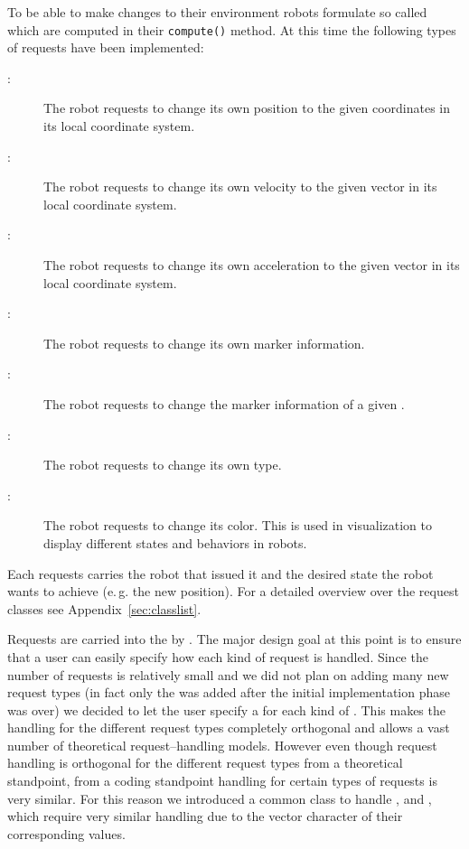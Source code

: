 To be able to make changes to their environment robots formulate so called  which are computed in their \texttt{compute()} method. At this time the following types of requests have been implemented:

\begin{description}
\item[:] The robot requests to change its own position to the given coordinates in its local coordinate system.
\item[:] The robot requests to change its own velocity to the given vector in its local coordinate system.
\item[:] The robot requests to change its own acceleration to the given vector in its local coordinate system.
\item[:] The robot requests to change its own marker information.
\item[:] The robot requests to change the marker information of a given .
\item[:] The robot requests to change its own type.
\item[:] The robot requests to change its color. This is used in visualization to display different states and behaviors in robots.
\end{description}

\noindent
Each requests carries the robot that issued it and the desired state the robot wants to achieve (e.\,g. the new position). For a detailed overview over the request classes see Appendix~\ref{sec:classlist}.\smallskip


\noindent
Requests are carried into the  by . The major design goal at this point is to ensure that a user can easily specify how each kind of request is handled. Since the number of requests is relatively small and we did not plan on adding many new request types (in fact only the  was added after the initial implementation phase was over) we decided to let the user specify a  for each kind of . This makes the handling for the different request types completely orthogonal and allows a vast number of theoretical request--handling models. However even though request handling is orthogonal for the different request types from a theoretical standpoint, from a coding standpoint handling for certain types of requests is very similar. For this reason we introduced a common class to handle ,  and , which require very similar handling due to the vector character of their corresponding values.

